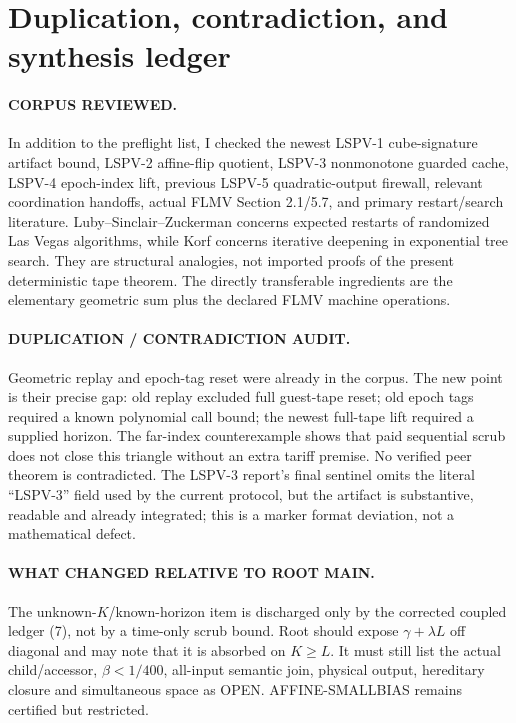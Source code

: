 \documentclass[11pt]{article}
\begin{document}
\section{Duplication, contradiction, and synthesis ledger}
\paragraph{CORPUS REVIEWED.}
In addition to the preflight list, I checked the newest LSPV-1 cube-signature
artifact bound, LSPV-2 affine-flip quotient, LSPV-3 nonmonotone guarded cache,
LSPV-4 epoch-index lift, previous LSPV-5 quadratic-output firewall, relevant
coordination handoffs, actual FLMV Section 2.1/5.7, and primary restart/search
literature.  Luby--Sinclair--Zuckerman concerns expected restarts of randomized
Las Vegas algorithms, while Korf concerns iterative deepening in exponential
tree search.  They are structural analogies, not imported proofs of the present
deterministic tape theorem.  The directly transferable ingredients are the
elementary geometric sum plus the declared FLMV machine operations.

\paragraph{DUPLICATION / CONTRADICTION AUDIT.}
Geometric replay and epoch-tag reset were already in the corpus.  The new point
is their precise gap: old replay excluded full guest-tape reset; old epoch tags
required a known polynomial call bound; the newest full-tape lift required a
supplied horizon.  The far-index counterexample shows that paid sequential scrub
does not close this triangle without an extra tariff premise.  No verified peer
theorem is contradicted.  The LSPV-3 report's final
sentinel omits the literal ``LSPV-3'' field used by the current protocol, but the
artifact is substantive, readable and already integrated; this is a marker
format deviation, not a mathematical defect.

\paragraph{WHAT CHANGED RELATIVE TO ROOT MAIN.}
The unknown-$K$/known-horizon item is discharged only by the corrected coupled
ledger (7), not by a time-only scrub bound.  Root should expose
$\gamma+\lambda L$ off diagonal and may note that it is absorbed on $K\ge L$.
It must still list the actual child/accessor, $\beta<1/400$, all-input
semantic join, physical output, hereditary closure and simultaneous space as
OPEN.  AFFINE-SMALLBIAS remains certified but restricted.
\end{document}
